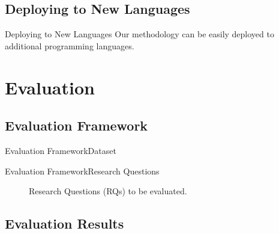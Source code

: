 \documentclass[11pt]{beamer}
\begin{document}
\subsection{Deploying to New Languages}

\begin{frame}{Deploying to New Languages}{}
	Our methodology can be easily deployed to additional programming languages.
	\begin{table}[!h]
		\setlength{\tabcolsep}{4pt}
		\centering
		\small
		\caption{Concept on which the CLAMS modules are based on.}
		
	\end{table}
\end{frame}

\section{Evaluation}

\subsection{Evaluation Framework}

\begin{frame}{Evaluation Framework}{Dataset}
	\begin{table}[!h]
		\setlength{\tabcolsep}{4pt}
		\centering
		\small
		\caption{Summary of the evaluation dataset.}
		\label{tables:Dataset}
		
	\end{table}
\end{frame}

\begin{frame}{Evaluation Framework}{Research Questions}
	\begin{figure}[ht]
		\centering
		\small
		\renewcommand{\arraystretch}{1.075}
		
		\caption{Research Questions (RQs) to be evaluated.}
		\label{tables:RQs}
	\end{figure}
\end{frame}

\subsection{Evaluation Results}
\end{document}
